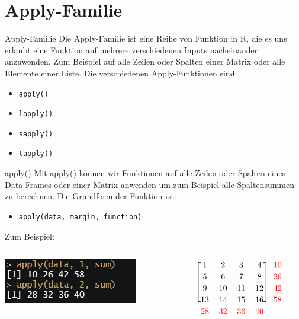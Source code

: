 \documentclass[xcolor=dvipsnames, aspectratio = 169]{beamer}
\begin{document}
\section{Apply-Familie}
\begin{frame}[fragile]{Apply-Familie}
	Die Apply-Familie ist eine Reihe von Funktion in R, die es uns erlaubt eine Funktion auf mehrere verschiedenen Inputs nacheinander anzuwenden. Zum Beispiel auf alle Zeilen oder Spalten einer Matrix oder alle Elemente einer Liste. Die verschiedenen Apply-Funktionen sind:  
	\begin{itemize}
		\item \verb+apply()+
		\item \verb+lapply()+
		\item \verb+sapply()+
		\item \verb+tapply()+
	\end{itemize}
\end{frame}

\begin{frame}[fragile]{apply()}
	Mit apply() können wir Funktionen auf alle Zeilen oder Spalten eines Data Frames oder einer Matrix anwenden um zum Beispiel alle Spaltensummen zu berechnen. Die Grundform der Funktion ist:
	\begin{itemize}
		\item \verb+apply(data, margin, function)+
	\end{itemize}
	Zum Beispiel:
	\begin{columns}[T]
		\begin{column}{0.5\textwidth}
			\includegraphics{Apply}
		\end{column}
		\begin{column}{0.4\textwidth}
			\[
			\renewcommand\BAextrarowheight{2pt}
			\begin{blockarray}{*{5}{c}}
				\begin{block}{[*{4}{c}]{c}}
				    1 &2 &3 &4&\textcolor{red}{10}\\
				    5 &6 &7 &8&\textcolor{red}{26}\\
				    9 &10 &11 &12&\textcolor{red}{42}\\
				    13 &14 &15 &16&\textcolor{red}{58}\\
				\end{block}
				\textcolor{red}{28} & \textcolor{red}{32} & \textcolor{red}{36} & \textcolor{red}{40}
			\end{blockarray}
			\]
		\end{column}
	\end{columns}
	
\end{frame}
\end{document}
